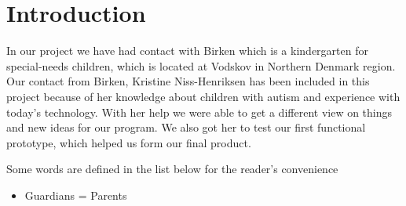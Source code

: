 \chapter{Introduction}

In our project we have had contact with Birken which is a kindergarten for special-needs children, which is located at Vodskov in Northern Denmark region.
Our contact from Birken, Kristine Niss-Henriksen has been included in this project because of her knowledge about children with autism and experience with today's technology.
With her help we were able to get a different view on things and new ideas for our program. We also got her to test our first functional prototype, which helped us form our final product.  

Some words are defined in the list below for the reader's convenience
\begin{itemize}
\item{Guardians = Parents}

\end{itemize}
